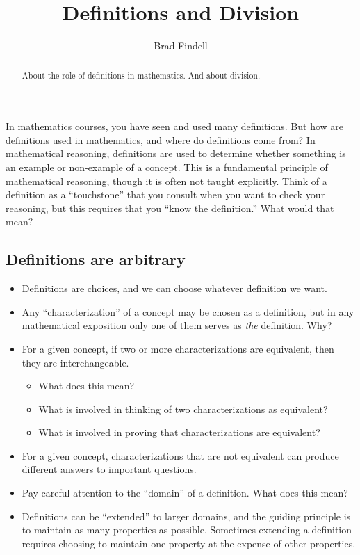\documentclass[space,nooutcomes]{ximera}
\title{Definitions and Division}
\author{Brad Findell}
\begin{document}
\begin{abstract}
About the role of definitions in mathematics.  And about division.
\end{abstract}
\maketitle



In mathematics courses, you have seen and used many definitions.  But how are definitions used in mathematics, and where do definitions come from?  In mathematical reasoning, definitions are used to determine whether something is an example or non-example of a concept.  This is a fundamental principle of mathematical reasoning, though it is often not taught explicitly.  Think of a definition as a ``touchstone'' that you consult when you want to check your reasoning, but this requires that you ``know the definition.''   What would that mean?  
\subsection*{Definitions are arbitrary}
\begin{itemize}
\item Definitions are choices, and we can choose whatever definition we want.  
\item Any ``characterization'' of a concept may be chosen as a definition, but in any mathematical exposition only one of them serves as \emph{the} definition.  Why?
\item For a given concept, if two or more characterizations are equivalent, then they are interchangeable.
\begin{itemize}
\item What does this mean?
\item What is involved in thinking of two characterizations as equivalent? 
\item What is involved in proving that characterizations are equivalent?  
\end{itemize}
\item For a given concept, characterizations that are not equivalent can produce different answers to important questions.
\item Pay careful attention to the ``domain'' of a definition.  What does this mean?  
\item Definitions can be ``extended'' to larger domains, and the guiding principle is to maintain as many properties as possible. Sometimes extending a definition requires choosing to maintain one property at the expense of other properties.  
\end{itemize}
\end{document}

